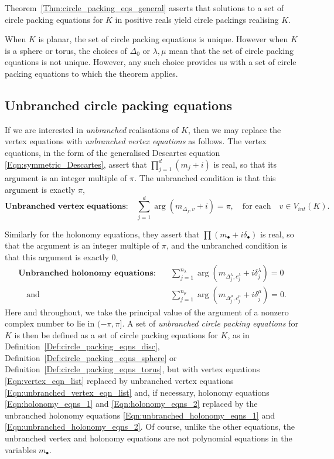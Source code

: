 \documentclass[12pt]{amsart}
\numberwithin{equation}{section}
\theoremstyle{named}
\newcommand{\refdef}[1]{Definition~\ref{Def:#1}}
\newcommand{\refeqn}[1]{\eqref{Eqn:#1}}
\newcommand{\refthm}[1]{Theorem~\ref{Thm:#1}}
\begin{document}
 \refthm{circle_packing_eqs_general} asserts that solutions to a set of circle packing equations for $K$ in positive reals yield circle packings realising $K$. 

 
When $K$ is planar, the set of circle packing equations is unique. However when $K$ is a sphere or torus, the choices of $\Delta_0$ or $\lambda, \mu$ mean that the set of circle packing equations is not unique. However, any such choice provides us with a set of circle packing equations to which the theorem applies. 

\subsection{ Unbranched circle packing equations}
If we are interested in \emph{unbranched} realisations of $K$, then we may replace the vertex equations with \emph{unbranched vertex equations} as follows. The vertex equations, in the form of the generalised Descartes equation \refeqn{symmetric_Descartes}, assert that $\prod_{j=1}^d (m_j + i)$ is real, so that its argument is an integer multiple of $\pi$. The unbranched condition is that this argument is exactly $\pi$,
\begin{equation}
\label{Eqn:unbranched_vertex_eqn_list} 
\textbf{Unbranched vertex equations:} \quad
\sum_{j=1}^d \arg \left( m_{\Delta_j,v} + i \right) = \pi, \quad
\text{for each} \quad v \in V_{int}(K).
\end{equation}

Similarly for the holonomy equations, they assert that $\prod \left( m_\bullet + i \delta_\bullet \right)$ is real, so that the argument is an integer multiple of $\pi$, and the unbranched condition is that this argument is exactly $0$,
\begin{align}
\label{Eqn:unbranched_holonomy_eqns_1}
\textbf{Unbranched holonomy equations:}& \quad
\sum_{j=1}^{n_\lambda} \arg \left( m_{\Delta^\lambda_j,c^\lambda_j} + i \delta^\lambda_j \right) = 0 \\
\label{Eqn:unbranched_holonomy_eqns_2}
\quad \text{and}& \quad
\sum_{j=1}^{n_\mu} \arg \left( m_{\Delta^\mu_j, c^\mu_j} + i \delta^\mu_j \right) = 0.
\end{align}
Here and throughout, we take the principal value of the argument of a nonzero complex number to lie in $(-\pi, \pi]$. A set of \emph{unbranched circle packing equations} for $K$ is then be defined as a set of circle packing equations for $K$, as in \refdef{circle_packing_eqns_disc}, \refdef{circle_packing_eqns_sphere} or \refdef{circle_packing_eqns_torus}, but with vertex equations \refeqn{vertex_eqn_list} replaced by unbranched vertex equations \refeqn{unbranched_vertex_eqn_list} and, if necessary, holonomy equations \refeqn{holonomy_eqns_1} and \refeqn{holonomy_eqns_2} replaced by the unbranched holonomy equations \refeqn{unbranched_holonomy_eqns_1} and \refeqn{unbranched_holonomy_eqns_2}. Of course, unlike the other equations, the unbranched vertex and holonomy equations are not polynomial equations in the variables $m_\bullet$.
\end{document}
